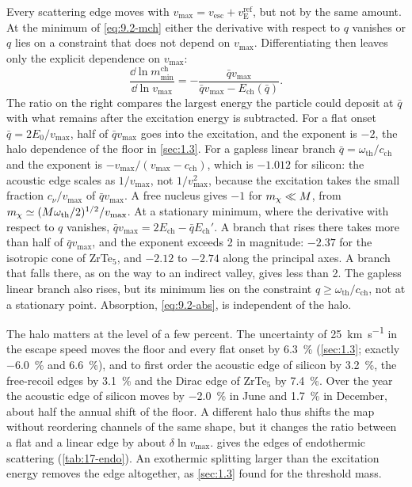 Every scattering edge moves with $v_{\mathrm{max}} = v_{\mathrm{esc}} + v_{\mathrm{E}}^{\mathrm{ref}}$, but not by the same amount. At the minimum of \cref{eq:9.2-mch} either the derivative with respect to $q$ vanishes or $q$ lies on a constraint that does not depend on $v_{\mathrm{max}}$. Differentiating then leaves only the explicit dependence on $v_{\mathrm{max}}$:
\begin{equation}
  \frac{\dd\ln m_{\mathrm{min}}^{\mathrm{ch}}}{\dd\ln v_{\mathrm{max}}} = -\frac{\bar qv_{\mathrm{max}}}{\bar qv_{\mathrm{max}} - E_{\mathrm{ch}}(\bar q)} .
  \label{eq:9.2-halo}
\end{equation}
The ratio on the right compares the largest energy the particle could deposit at $\bar q$ with what remains after the excitation energy is subtracted. For a flat onset $\bar q = 2E_0/v_{\mathrm{max}}$, half of $\bar qv_{\mathrm{max}}$ goes into the excitation, and the exponent is $-2$, the halo dependence of the floor in \cref{sec:1.3}. For a gapless linear branch $\bar q = \omega_{\mathrm{th}}/c_{\mathrm{ch}}$ and the exponent is $-v_{\mathrm{max}}/(v_{\mathrm{max}} - c_{\mathrm{ch}})$, which is $-1.012$ for silicon: the acoustic edge scales as $1/v_{\mathrm{max}}$, not $1/v_{\mathrm{max}}^2$, because the excitation takes the small fraction $c_\nu/v_{\mathrm{max}}$ of $\bar qv_{\mathrm{max}}$. A free nucleus gives $-1$ for $m_{\chi} \ll M$, from $m_{\chi} \simeq (M\omega_{\mathrm{th}}/2)^{1/2}/v_{\mathrm{max}}$. At a stationary minimum, where the derivative with respect to $q$ vanishes, $\bar qv_{\mathrm{max}} = 2E_{\mathrm{ch}} - \bar qE_{\mathrm{ch}}'$. A branch that rises there takes more than half of $\bar qv_{\mathrm{max}}$, and the exponent exceeds 2 in magnitude: $-2.37$ for the isotropic cone of ZrTe$_5$, and $-2.12$ to $-2.74$ along the principal axes. A branch that falls there, as on the way to an indirect valley, gives less than 2. The gapless linear branch also rises, but its minimum lies on the constraint $q \ge \omega_{\mathrm{th}}/c_{\mathrm{ch}}$, not at a stationary point. Absorption, \cref{eq:9.2-abs}, is independent of the halo.

The halo matters at the level of a few percent. The uncertainty of \SI{25}{km.s^{-1}} in the escape speed moves the floor and every flat onset by \SI{6.3}{\percent} (\cref{sec:1.3}; exactly \SI{-6.0}{\percent} and \SI{+6.6}{\percent}), and to first order the acoustic edge of silicon by \SI{3.2}{\percent}, the free-recoil edges by \SI{3.1}{\percent} and the Dirac edge of ZrTe$_5$ by \SI{7.4}{\percent}. Over the year the acoustic edge of silicon moves by \SI{-2.0}{\percent} in June and \SI{+1.7}{\percent} in December, about half the annual shift of the floor. A different halo thus shifts the map without reordering channels of the same shape, but it changes the ratio between a flat and a linear edge by about $\delta\ln v_{\mathrm{max}}$.  gives the edges of endothermic scattering (\cref{tab:17-endo}). An exothermic splitting larger than the excitation energy removes the edge altogether, as \cref{sec:1.3} found for the threshold mass.
